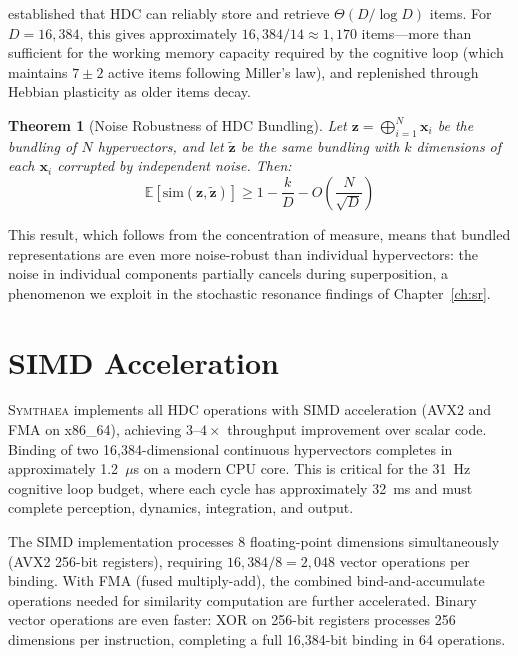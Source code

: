 \documentclass[12pt]{book}
\newtheorem{theorem}{Theorem}[chapter]
\newcommand{\symthaea}{\textsc{Symthaea}}
\newcommand{\E}{\mathbb{E}}
\begin{document}
\citet{thomas2021theoretical} established that HDC can reliably store and retrieve $\Theta(D / \log D)$ items. For $D = 16{,}384$, this gives approximately $16{,}384 / 14 \approx 1{,}170$ items---more than sufficient for the working memory capacity required by the cognitive loop (which maintains $7 \pm 2$ active items following Miller's law), and replenished through Hebbian plasticity as older items decay.

\begin{theorem}[Noise Robustness of HDC Bundling]
Let $\mathbf{z} = \bigoplus_{i=1}^{N} \mathbf{x}_i$ be the bundling of $N$ hypervectors, and let $\tilde{\mathbf{z}}$ be the same bundling with $k$ dimensions of each $\mathbf{x}_i$ corrupted by independent noise. Then:
\begin{equation}
\E[\text{sim}(\mathbf{z}, \tilde{\mathbf{z}})] \geq 1 - \frac{k}{D} - O\!\left(\frac{N}{\sqrt{D}}\right)
\end{equation}
\end{theorem}

This result, which follows from the concentration of measure, means that bundled representations are even more noise-robust than individual hypervectors: the noise in individual components partially cancels during superposition, a phenomenon we exploit in the stochastic resonance findings of Chapter~\ref{ch:sr}.

\section{SIMD Acceleration}

\symthaea{} implements all HDC operations with SIMD acceleration (AVX2 and FMA on x86\_64), achieving $3$--$4\times$ throughput improvement over scalar code. Binding of two 16,384-dimensional continuous hypervectors completes in approximately 1.2~$\mu$s on a modern CPU core. This is critical for the 31~Hz cognitive loop budget, where each cycle has approximately 32~ms and must complete perception, dynamics, integration, and output.

The SIMD implementation processes 8 floating-point dimensions simultaneously (AVX2 256-bit registers), requiring $16{,}384 / 8 = 2{,}048$ vector operations per binding. With FMA (fused multiply-add), the combined bind-and-accumulate operations needed for similarity computation are further accelerated. Binary vector operations are even faster: XOR on 256-bit registers processes 256 dimensions per instruction, completing a full 16,384-bit binding in 64 operations.
\end{document}
